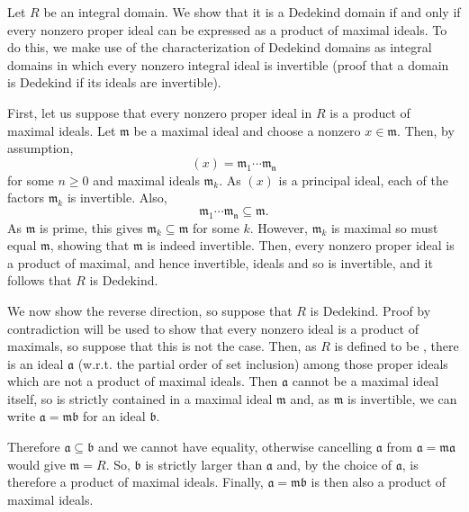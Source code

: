 \documentclass[12pt]{article}
\begin{document}
Let $R$ be an integral domain. We show that it is a Dedekind domain if and only if every nonzero proper ideal can be expressed as a product of maximal ideals.
To do this, we make use of the characterization of Dedekind domains as integral domains in which every nonzero integral ideal is invertible (proof that a domain is Dedekind if its ideals are invertible).

First, let us suppose that every nonzero proper ideal in $R$ is a product of maximal ideals.
Let $\mathfrak{m}$ be a maximal ideal and choose a nonzero $x\in\mathfrak{m}$. Then, by assumption,
\begin{equation*}
(x)=\mathfrak{m}_1\cdots\mathfrak{m_n}
\end{equation*}
for some $n\ge 0$ and maximal ideals $\mathfrak{m}_k$. As $(x)$ is a principal ideal, each of the factors $\mathfrak{m}_k$ is invertible.
Also,
\begin{equation*}
\mathfrak{m}_1\cdots\mathfrak{m_n}\subseteq\mathfrak{m}.
\end{equation*}
As $\mathfrak{m}$ is prime, this gives $\mathfrak{m}_k\subseteq\mathfrak{m}$ for some $k$. However, $\mathfrak{m}_k$ is maximal so must equal $\mathfrak{m}$, showing that $\mathfrak{m}$ is indeed invertible.
Then, every nonzero proper ideal is a product of maximal, and hence invertible, ideals and so is invertible, and it follows that $R$ is Dedekind.


We now show the reverse direction, so suppose that $R$ is Dedekind.
Proof by contradiction will be used to show that every nonzero ideal is a product of maximals, so suppose that this is not the case.
Then, as $R$ is defined to be , there is an ideal $\mathfrak{a}$  (w.r.t. the partial order of set inclusion) among those proper ideals which are not a product of maximal ideals.
Then $\mathfrak{a}$ cannot be a maximal ideal itself, so is strictly contained in a maximal ideal $\mathfrak{m}$ and, as $\mathfrak{m}$ is invertible, we can write $\mathfrak{a}=\mathfrak{mb}$ for an ideal $\mathfrak{b}$.

Therefore $\mathfrak{a}\subseteq\mathfrak{b}$ and we cannot have equality, otherwise cancelling $\mathfrak{a}$ from $\mathfrak{a}=\mathfrak{ma}$ would give $\mathfrak{m}=R$. So, $\mathfrak{b}$ is strictly larger than $\mathfrak{a}$ and, by the choice of $\mathfrak{a}$, is therefore a product of maximal ideals. Finally, $\mathfrak{a}=\mathfrak{mb}$ is then also a product of maximal ideals.

\end{document}
